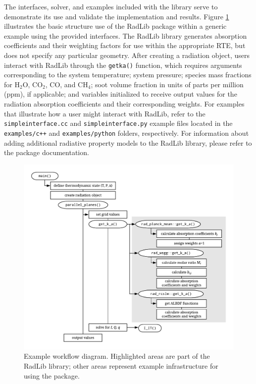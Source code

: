 \documentclass[preprint,12pt]{elsarticle}
\begin{document}
The interfaces, solver, and examples included with the library serve to demonstrate its use and validate the implementation and results. Figure \ref{fig:flowchart} illustrates the basic structure use of the RadLib package within a generic example using the provided interfaces. The RadLib library generates absorption coefficients and their weighting factors for use within the appropriate RTE, but does not specify any particular geometry. After creating a radiation object, users interact with RadLib through the \texttt{get\textunderscore k\textunderscore a()} function, which requires arguments corresponding to the system temperature; system pressure; species mass fractions for H$_2$O, CO$_2$, CO, and CH$_4$; soot volume fraction in units of parts per million (ppm), if applicable; and variables initialized to receive output values for the radiation absorption coefficients and their corresponding weights. For examples that illustrate how a user might interact with RadLib, refer to the \texttt{simple\textunderscore interface.cc} and \texttt{simple\textunderscore interface.py} example files located in the \texttt{examples/c++} and \texttt{examples/python} folders, respectively. For information about adding additional radiative property models to the RadLib library, please refer to the package documentation. 
%
\begin{figure}
	\begin{center}
        \includegraphics[width=\textwidth]{fig_radlib_structure.pdf}
	\end{center}
	\caption{Example workflow diagram. Highlighted areas are part of the RadLib library; other areas represent example infrastructure for using the package.}
\label{fig:flowchart}
\end{figure}
%
\end{document}
